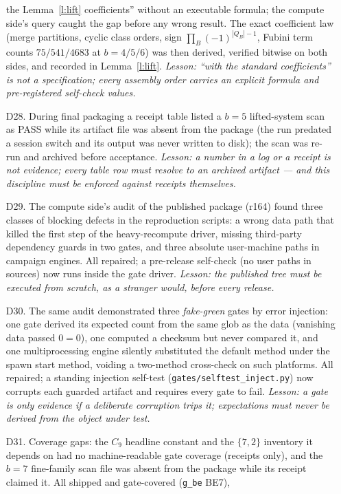 \documentclass[11pt]{article}
\numberwithin{equation}{section}
\theoremstyle{definition}
\theoremstyle{remark}
\begin{document}
\begin{itemize}
the Lemma~\ref{l:lift} coefficients'' without an executable
formula; the compute side's query caught the gap before any
wrong result. The exact coefficient law (merge partitions,
cyclic class orders, sign $\prod_B(-1)^{|Q_B|-1}$, Fubini
term counts $75/541/4683$ at $b=4/5/6$) was then derived,
verified bitwise on both sides, and recorded in
Lemma~\ref{l:lift}. \emph{Lesson: ``with the standard
coefficients'' is not a specification; every assembly order
carries an explicit formula and pre-registered self-check
values.}
\item[D28.] During final packaging a receipt table listed a
$b=5$ lifted-system scan as PASS while its artifact file was
absent from the package (the run predated a session switch
and its output was never written to disk); the scan was
re-run and archived before acceptance. \emph{Lesson: a
number in a log or a receipt is not evidence; every table
row must resolve to an archived artifact --- and this
discipline must be enforced against receipts themselves.}
\item[D29.] The compute side's audit of the published package
(r164) found three classes of blocking defects in the
reproduction scripts: a wrong data path that killed the first
step of the heavy-recompute driver, missing third-party
dependency guards in two gates, and three absolute
user-machine paths in campaign engines. All repaired; a
pre-release self-check (no user paths in sources) now runs
inside the gate driver. \emph{Lesson: the published tree must
be executed from scratch, as a stranger would, before every
release.}
\item[D30.] The same audit demonstrated three \emph{fake-green}
gates by error injection: one gate derived its expected count
from the same glob as the data (vanishing data passed
$0=0$), one computed a checksum but never compared it, and
one multiprocessing engine silently substituted the default
method under the spawn start method, voiding a two-method
cross-check on such platforms. All repaired; a standing
injection self-test (\texttt{gates/selftest\_inject.py}) now
corrupts each guarded artifact and requires every gate to
fail. \emph{Lesson: a gate is only evidence if a deliberate
corruption trips it; expectations must never be derived from
the object under test.}
\item[D31.] Coverage gaps: the $C_9$ headline constant and the
$\{7,2\}$ inventory it depends on had no machine-readable
gate coverage (receipts only), and the $b=7$ fine-family scan
file was absent from the package while its receipt claimed
it. All shipped and gate-covered (\texttt{g\_be} BE7),

\end{itemize}
\end{document}
